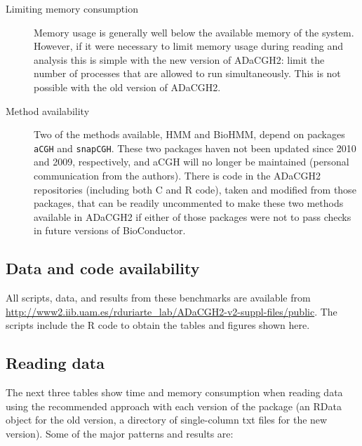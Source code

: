 \documentclass[a4paper,11pt]{article}
\begin{document}
\begin{description}
\item[Limiting memory consumption] Memory usage is generally well below
  the available memory of the system. However, if it were necessary to
  limit memory usage during reading and analysis this is simple with the
  new version of ADaCGH2: limit the number of processes that are allowed
  to run simultaneously. This is not possible with the old version of
  ADaCGH2.

\item[Method availability] Two of the methods available, HMM and BioHMM,
  depend on packages \texttt{aCGH} and \texttt{snapCGH}. These two
  packages haven not been updated since 2010 and 2009, respectively, and
  aCGH will no longer be maintained (personal communication from the
  authors). There is code in the ADaCGH2 repositories (including both C
  and R code), taken and modified from those packages, that can be readily
  uncommented to make these two methods available in ADaCGH2 if either of
  those packages were not to pass checks in future versions of
  BioConductor.
 
\end{description}



\subsection{Data and code availability}

All scripts, data, and results from these benchmarks are available from
\url{http://www2.iib.uam.es/rduriarte\_lab/ADaCGH2-v2-suppl-files/public}. The
scripts include the R code to obtain the tables and figures shown here.




\clearpage
\subsection{Reading data}\label{comp-read}

The next three tables show time and memory consumption when reading data
using the recommended approach with each version of the package (an RData
object for the old version, a directory of single-column txt files for the
new version). Some of the major patterns and results are:
\end{document}
